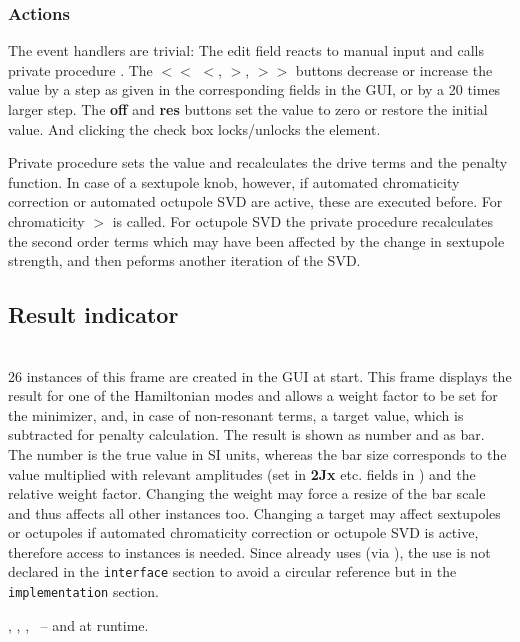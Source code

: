 \documentclass[12pt]{article}
\newcommand\code[1]{{\tt #1}}
\newcommand{\ofld}[1]{\colorbox{black!15}{{{\color{black}\bf #1}}}}
\newcommand\guifco[1]{{\color{violet}\code{#1}}}
\newcommand{\unico}[1]{{\color{burntorange}\code{#1}}}
\newcommand{\prcod}[2]{\opauni{#1}$>$\unico{#2}}
\newcommand{\opagui}[1]{\colorbox{blue!20}{{\color{black}\code{#1}}}}
\newcommand{\ogui}[1]{\hyperref[#1]{\opagui{#1}}}
\newcommand{\opaguif}[1]{\colorbox{violet!30}{{\color{black}\code{#1}}}}
\newcommand{\oguifh}[2]{\subsection{\label{#2}#1}{\Huge\opaguif{#2}}\\}
\newcommand{\oguif}[1]{\hyperref[#1]{\opaguif{#1}}}
\newcommand{\opauni}[1]{\colorbox{orange!30}{{\color{black}\code{#1}}}}
\newcommand{\ouni}[1]{\hyperref[#1]{\opauni{#1}}}
\newcommand{\uses}[1]{\flushleft {\bf Uses:} #1}
\newcommand{\desc}[1]{#1}
\newcommand{\act}[1]{\subsubsection*{Actions} #1}
\begin{document}
\act{
The event handlers are trivial: The edit field reacts to manual input and calls private procedure \guifco{UpdateVal}. The \ofld{$<<$} \ofld{$<$}, \ofld{$>$}, \ofld{$>>$} buttons decrease or increase the value by a step as given in the corresponding fields in the \ogui{opachroma} GUI, or by a 20 times larger step. The \ofld{off} and \ofld{res} buttons set the value to zero or restore the initial value. And clicking the check box locks/unlocks the element.

Private procedure \guifco{UpdateVal} sets the value and recalculates the drive terms and the penalty function. In case of a sextupole knob, however, if automated chromaticity correction or automated octupole SVD are active, these are executed before. For chromaticity \prcod{chromlib}{ChromCorrect} is called. For octupole SVD the private procedure \guifco{OsvdStep} recalculates the second order terms which may have been affected by the change in sextupole strength, and then peforms another iteration of the SVD. 
}


\oguifh{Result indicator}{chamframe} 

\desc{26 instances of this frame are created in the \ogui{opachroma} GUI at start. This frame displays the result for one of the Hamiltonian modes and allows a weight factor to be set for the minimizer, and, in case of non-resonant terms, a target value, which is subtracted for penalty calculation.  The result is shown as number and as bar. The number is the true value in SI units, whereas the bar size corresponds to the value multiplied with relevant amplitudes (set in \ofld{2Jx} etc. fields in \ogui{opachroma}) and the relative weight factor. Changing the weight may force a resize of the bar scale and thus affects all other \oguif{chamframe} instances too. Changing a target may affect sextupoles or octupoles if automated chromaticity correction or octupole SVD is active, therefore access to \oguif{csexframe} instances is needed. Since \oguif{csexframe} already uses \oguif{chamframe} (via \ouni{chromreslib}), the use is not declared in the \code{interface} section to avoid a circular reference but in the \code{implementation} section. 
}

\uses{
\ouni{chromelelib},  \ouni{chromlib}, \ouni{globlib}, \ouni{comauxlib}~-- and \oguif{csexframe} at runtime.
}
\end{document}
